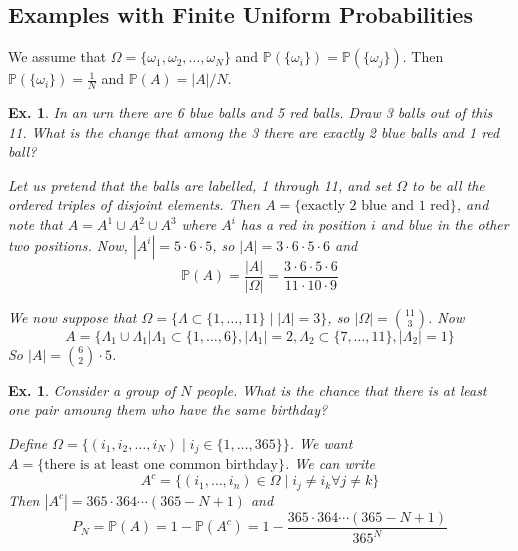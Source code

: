 \documentclass[12pt, a4paper]{book}
\newtheorem{example}[theorem]{Ex.}
\theoremstyle{nonumberplain}
\begin{document}
\subsection{Examples with Finite Uniform Probabilities}
We assume that $\Omega=\{\omega_1,\omega_2,\dots,\omega_N\}$ and $\mathbb{P}(\{\omega_i\})=\mathbb{P}(\{\omega_j\})$.
Then $\mathbb{P}(\{\omega_i\})=\frac{1}{N}$ and $\mathbb{P}(A)=|A|/N$.
\begin{example}
    In an urn there are 6 blue balls and 5 red balls.
    Draw 3 balls out of this 11.
    What is the change that among the 3 there are exactly 2 blue balls and 1 red ball?

    Let us pretend that the balls are labelled, 1 through 11, and set $\Omega$ to be all the ordered triples of disjoint elements.
    Then $A=\{\text{exactly 2 blue and 1 red}\}$, and note that $A=A^1\cup A^2\cup A^3$ where $A^i$ has a red in position $i$ and blue in the other two positions.
    Now, $|A^i|=5\cdot 6\cdot5$, so $|A|=3\cdot6\cdot5\cdot 6$ and
    \[\mathbb{P}(A)=\frac{|A|}{|\Omega|}=\frac{3\cdot 6\cdot 5\cdot 6}{11\cdot 10\cdot 9}\]

    We now suppose that $\Omega=\{\Lambda\subset\{1,\ldots,11\}\mid |\Lambda|=3\}$, so $|\Omega|=\binom{11}{3}$.
    Now
    \[A=\{\Lambda_1\cup\Lambda_1|\Lambda_1\subset\{1,\ldots,6\},|\Lambda_1|=2,\Lambda_2\subset\{7,\ldots,11\},|\Lambda_2|=1\}\]
    So $|A|=\binom{6}{2}\cdot 5$.
\end{example}
\begin{example}
    Consider a group of $N$ people.
    What is the chance that there is at least one pair amoung them who have the same birthday?

    Define $\Omega=\{(i_1,i_2,\ldots,i_N)\mid i_j\in\{1,\ldots,365\}\}$.
    We want $A=\{\text{there is at least one common birthday}\}$.
    We can write
    \[A^c=\{(i_1,\ldots,i_n)\in\Omega\mid i_j\neq i_k \forall j\neq k\}\]
    Then $|A^c|=365\cdot 364\cdots (365-N+1)$ and
    \[P_N=\mathbb{P}(A)=1-\mathbb{P}(A^c)=1-\frac{365\cdot364\cdots(365-N+1)}{365^N}\]
\end{example}
\end{document}
